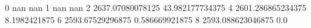 0 nan nan
1 nan nan
2 2637.07080078125 43.982177734375
4 2601.286865234375 8.1982421875
6 2593.67529296875 0.586669921875
8 2593.088623046875 0.0
